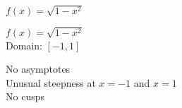 {$f(x) = \sqrt{1 - x^{2}}$}
{$f(x) = \sqrt{1 - x^2}$\\
Domain: $[-1, 1]$\\
\begin{center}
\end{center}

No asymptotes\\
Unusual steepness at $x = -1$ and $x = 1$\\
No cusps\\

\begin{center}
\end{center}}